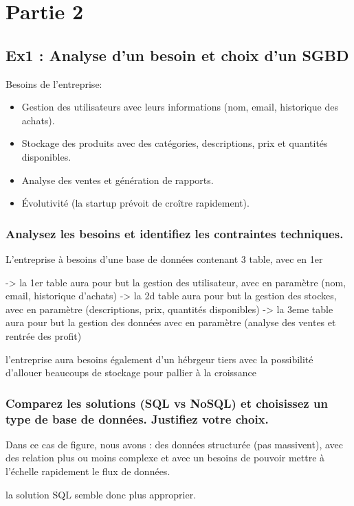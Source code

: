 \documentclass{article}
\begin{document}
\section{Partie 2}


\subsection{Ex1 : Analyse d’un besoin et choix d’un SGBD}

Besoins de l'entreprise: 
    \begin{itemize}
      \item Gestion des utilisateurs avec leurs informations (nom, email, historique des achats).
      \item Stockage des produits avec des catégories, descriptions, prix et quantités disponibles.
      \item Analyse des ventes et génération de rapports.
      \item Évolutivité (la startup prévoit de croître rapidement).
    \end{itemize}

\subsubsection{Analysez les besoins et identifiez les contraintes techniques.}
L'entreprise à besoins d'une base de données contenant 3 table, avec en 1er 

-> la 1er table aura pour but la gestion des utilisateur, avec en paramètre (nom, email, historique d'achats)
-> la 2d table aura pour but la gestion des stockes, avec en paramètre (descriptions, prix, quantités disponibles)
-> la 3eme table aura pour but la gestion des données avec en paramètre (analyse des ventes et rentrée des profit)

l'entreprise aura besoins également d'un hébrgeur tiers avec la possibilité d'allouer beaucoups de stockage pour pallier à la croissance 

\subsubsection{Comparez les solutions (SQL vs NoSQL) et choisissez un type de base de données. Justifiez votre 
choix.}
Dans ce cas de figure, nous avons :
des données structurée (pas massivent), avec des relation plus ou moins complexe et avec un besoins de pouvoir mettre à l'échelle rapidement le flux de données.

la solution SQL semble donc plus approprier. 
\end{document}
